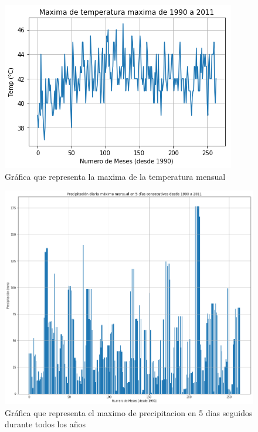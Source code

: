 \documentclass[12pt]{article}
\begin{document}
\begin{figure}
    \centering
    \includegraphics[scale=.8]{indice5.png}
    \caption{Gráfica que representa la maxima de la temperatura mensual}
    \label{fig:indice5}
\end{figure}
\begin{figure}
    \centering
    \includegraphics[scale=.3]{indice11.png}
    \caption{Gráfica que representa el maximo de precipitacion en 5 dias seguidos durante todos los años}
    \label{fig:indice11}
\end{figure}
\end{document}
